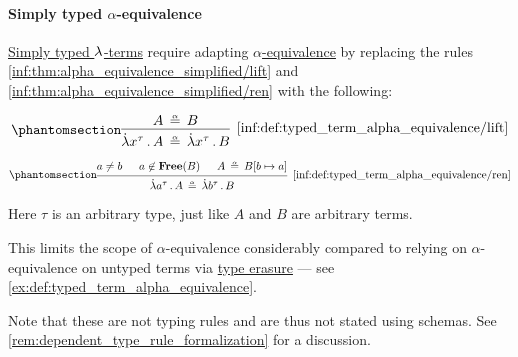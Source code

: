 \paragraph{Simply typed \( \alpha \)-equivalence}

\begin{definition}\label{def:typed_term_alpha_equivalence}
  \hyperref[def:typed_lambda_term]{Simply typed \( {\mathrm \lambda} \)-terms} require adapting \hyperref[def:lambda_term_alpha_equivalence]{\( \alpha \)-equivalence} by replacing the rules \ref{inf:thm:alpha_equivalence_simplified/lift} and \ref{inf:thm:alpha_equivalence_simplified/ren} with the following:
  \begin{paracol}{2}
    \begin{leftcolumn}
      \ParacolAlignmentHack
      \begin{equation*}\taglabel[\ensuremath{ \logic{Lift}_\alpha^{\logic{tt}} }]{inf:def:typed_term_alpha_equivalence/lift}
        \begin{prooftree}
          \hypo{ A \aequiv B }
          \infer1[\ref{inf:def:typed_term_alpha_equivalence/lift}]{ \qabs {x^\tau} A \aequiv \qabs {x^\tau} B }
        \end{prooftree}
      \end{equation*}
    \end{leftcolumn}

    \begin{rightcolumn}
      \ParacolAlignmentHack
      \begin{equation*}\taglabel[\ensuremath{ \logic{Ren}_\alpha^{\logic{tt}} }]{inf:def:typed_term_alpha_equivalence/ren}
        \begin{prooftree}
          \hypo{ a \neq b }
          \hypo{ a \not\in \op*{Free}(B) }
          \hypo{ A \aequiv B[b \mapsto a] }
          \infer3[\ref{inf:def:typed_term_alpha_equivalence/ren}]{ \qabs {a^\tau} A \aequiv \qabs {b^\tau} B }
        \end{prooftree}
      \end{equation*}
    \end{rightcolumn}
  \end{paracol}
\end{definition}
\begin{comments}
  \item Here \( \tau \) is an arbitrary type, just like \( A \) and \( B \) are arbitrary terms.

  \item This limits the scope of \( \alpha \)-equivalence considerably compared to relying on \( \alpha \)-equivalence on untyped terms via \hyperref[alg:type_erasure]{type erasure} --- see \cref{ex:def:typed_term_alpha_equivalence}.

  \item Note that these are not typing rules and are thus not stated using schemas. See \cref{rem:dependent_type_rule_formalization} for a discussion.
\end{comments}

